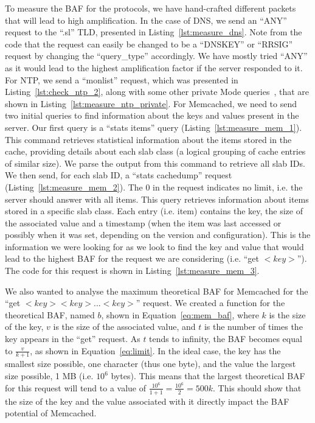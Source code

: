 To measure the BAF for the protocols, we have hand-crafted different packets that will lead to high amplification. In the case of DNS, we send an ``ANY'' request to the ``.sl'' TLD, presented in Listing~\ref{lst:measure_dns}. Note from the code that the request can easily be changed to be a ``DNSKEY'' or ``RRSIG'' request by changing the ``query\_type'' accordingly. We have mostly tried ``ANY'' as it would lead to the highest amplification factor if the server responded to it. For NTP, we send a ``monlist'' request, which was presented in Listing~\ref{lst:check_ntp_2}, along with some other private Mode queries~\cite{rapid7_private}, that are shown in Listing~\ref{lst:measure_ntp_private}.  For Memcached, we need to send two initial queries to find information about the keys and values present in the server. Our first query is a ``stats items'' query (Listing~\ref{lst:measure_mem_1}). This command retrieves statistical information about the items stored in the cache, providing details about each slab class (a logical grouping of cache entries of similar size). We parse the output from this command to retrieve all slab IDs. We then send, for each slab ID, a ``stats cachedump'' request (Listing~\ref{lst:measure_mem_2}). The 0 in the request indicates no limit, i.e. the server should answer with all items. This query retrieves information about items stored in a specific slab class. Each entry (i.e. item) contains the key, the size of the associated value and a timestamp (when the item was last accessed or possibly when it was set, depending on the version and configuration). This is the information we were looking for as we look to find the key and value that would lead to the highest BAF for the request we are considering (i.e. ``get $<key>$''). The code for this request is shown in Listing~\ref{lst:measure_mem_3}.

We also wanted to analyse the maximum theoretical BAF for Memcached for the ``get $<key> <key> ... <key>$'' request. We created a function for the theoretical BAF, named $b$, shown in Equation~\eqref{eq:mem_baf}, where $k$ is the size of the key, $v$ is the size of the associated value, and $t$ is the number of times the key appears in the ``get'' request. As $t$ tends to infinity, the BAF becomes equal to $\frac{v}{k + 1}$, as shown in Equation~\ref{eq:limit}. In the ideal case, the key has the smallest size possible, one character (thus one byte), and the value the largest size possible, 1 MB (i.e. $10^6$ bytes). This means that the largest theoretical BAF for this request will tend to a value of $\frac{10^6}{1+1} =\frac{10^6}{2}=500k$. This should show that the size of the key and the value associated with it directly impact the BAF potential of Memcached. 


